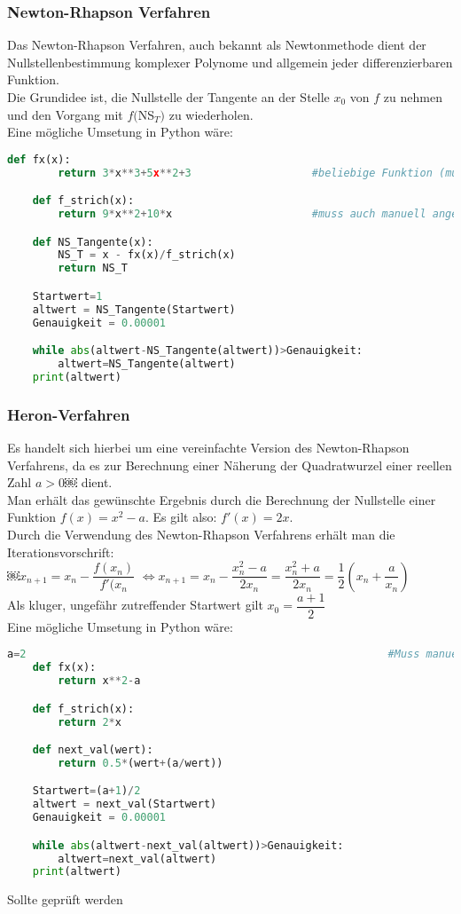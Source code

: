 \subsubsection{Newton-Rhapson Verfahren}
Das Newton-Rhapson Verfahren, auch bekannt als Newtonmethode dient der Nullstellenbestimmung komplexer Polynome und allgemein jeder differenzierbaren Funktion.\\
Die Grundidee ist, die Nullstelle der Tangente an der Stelle $x_0$ von $f$ zu nehmen und den Vorgang mit $f($NS$_T)$ zu wiederholen.\\
Eine mögliche Umsetung in Python wäre:\\
\begin{lstlisting}[language=Python]
	def fx(x):
		return 3*x**3+5x**2+3					#beliebige Funktion (muss angegeben werden)

	def f_strich(x):
		return 9*x**2+10*x						#muss auch manuell angegeben werden

	def NS_Tangente(x):
		NS_T = x - fx(x)/f_strich(x)
		return NS_T

	Startwert=1
	altwert = NS_Tangente(Startwert)
	Genauigkeit = 0.00001

	while abs(altwert-NS_Tangente(altwert))>Genauigkeit:
		altwert=NS_Tangente(altwert)
	print(altwert)

\end{lstlisting}
\subsubsection{Heron-Verfahren}
Es handelt sich hierbei um eine vereinfachte Version des Newton-Rhapson Verfahrens, da es zur Berechnung einer Näherung der Quadratwurzel einer reellen Zahl $a>0$￼ dient.\\
Man erhält das gewünschte Ergebnis durch die Berechnung der Nullstelle einer Funktion $f(x)=x^{2}-a$. Es gilt also: $f'(x)=2x$.\\
Durch die Verwendung des Newton-Rhapson Verfahrens erhält man die Iterationsvorschrift:\\
￼$x_{n+1}=x_{n}-\dfrac{f(x_{n})}{f'(x_{n}}$
$\Leftrightarrow x_{n+1}=x_{n}-\dfrac{x_{n}^{2}-a}{2x_{n}}=\dfrac{x_{n}^{2}+a}{2x_{n}}=\dfrac{1}{2}(x_{n}+\dfrac{a}{x_{n}})$\\
Als kluger, ungefähr zutreffender Startwert gilt $x_0=\dfrac{a+1}{2}$\\
Eine mögliche Umsetung in Python wäre:\\

\begin{lstlisting}[language=Python]
	a=2															#Muss manuell angegeben werden
	def fx(x):
		return x**2-a

	def f_strich(x):
		return 2*x

	def next_val(wert):
		return 0.5*(wert+(a/wert))

	Startwert=(a+1)/2
	altwert = next_val(Startwert)
	Genauigkeit = 0.00001

	while abs(altwert-next_val(altwert))>Genauigkeit:
		altwert=next_val(altwert)
	print(altwert)
\end{lstlisting}
Sollte geprüft werden
